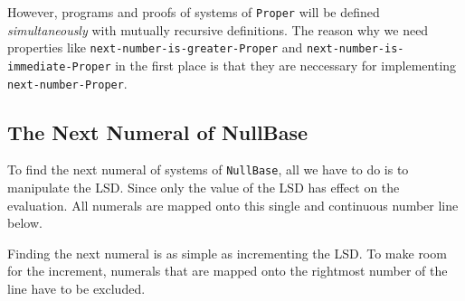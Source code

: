 \documentclass[\main/thesis.tex]{subfiles}
\begin{document}
However, programs and proofs of systems of {\lstinline|Proper|} will be defined
\textit{simultaneously} with mutually recursive definitions.
The reason why we need properties like {\lstinline|next-number-is-greater-Proper|}
and {\lstinline|next-number-is-immediate-Proper|} in the first place is that
they are neccessary for implementing {\lstinline|next-number-Proper|}.

\subsection{The Next Numeral of NullBase}

To find the next numeral of systems of {\lstinline|NullBase|},
all we have to do is to manipulate the LSD.
Since only the value of the LSD has effect on the evaluation.
All numerals are mapped onto this single and continuous number line below.

\begin{center}
    \begin{adjustbox}{max width=\textwidth}
    \end{adjustbox}
\end{center}

Finding the next numeral is as simple as incrementing the LSD.
To make room for the increment, numerals that are mapped onto the rightmost
number of the line have to be excluded.
\end{document}
